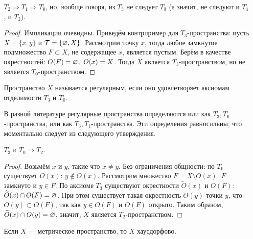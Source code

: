 \begin{statement}
    $T_2 \Rightarrow T_1 \Rightarrow T_0$, но, вообще говоря, из $T_3$ не следует $T_0$ (а значит, не следуют и $T_1$, и $T_2$).
\end{statement}
\begin{proof}
    Импликации очевидны. Приведём контрпример для $T_3$-пространства: пусть $X = \{x, y\}$ и $\mathcal{T} = \{\varnothing, X\}$. Рассмотрим точку $x$, тогда любое замкнутое подмножество $F \subset X$, не содержащее $x$, является пустым. Берём в качестве окрестностей: $O(F) = \varnothing, \ O(x) = X$. Тогда $X$ является $T_3$-пространством, но не является $T_0$-пространством.  
\end{proof}

\begin{definition}
    Пространство $X$ называется регулярным, если оно удовлетворяет аксиомам отделимости $T_3$ и $T_0$.   
\end{definition}

\begin{nota_bene}
    В разной литературе регулярные пространства определяются или как $T_3, T_0$-пространства, или как $T_3,T_1$-пространства. Эти определения равносильны, что моментально следует из следующего утверждения.
\end{nota_bene}

\begin{statement}
    $T_3$ и $T_0 \Rightarrow T_2$.
\end{statement}
\begin{proof}
    Возьмём $x$ и $y$, такие что $x \neq y$. Без ограничения общности: по $T_0$ существует $O(x)$: $y \not\in O(x)$. Рассмотрим множество $F = X \setminus O(x)$. $F$ замкнуто и $y \in F$. По аксиоме $T_3$ существуют окрестности $\widetilde{O}(x)$ и $O(F)$: $\widetilde{O}(x) \cap O(F) = \varnothing$. При этом существует такая окрестность $O(y)$ точки $y$, что $O(y) \subset O(F)$, так как $y \in O(F)$ и $O(F)$ открыто. Таким образом, $\widetilde{O}(x) \cap O(y) = \varnothing$, значит, $X$ является $T_2$-пространством.
\end{proof}

\begin{example}
    Если $X$ --- метрическое пространство, то $X$ хаусдорфово.
\end{example}

